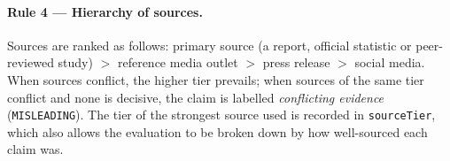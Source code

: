\paragraph{Rule 4 --- Hierarchy of sources.}
Sources are ranked as follows: primary source (a report, official
statistic or peer-reviewed study) $>$ reference media outlet $>$
press release $>$ social media. When sources conflict, the higher
tier prevails; when sources of the same tier conflict and none is
decisive, the claim is labelled \emph{conflicting evidence}
(\texttt{MISLEADING}). The tier of the strongest source used is
recorded in \texttt{sourceTier}, which also allows the evaluation to
be broken down by how well-sourced each claim was.
